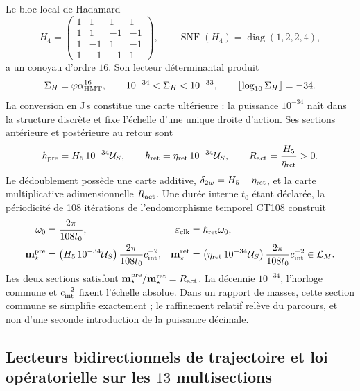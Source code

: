Le bloc local de Hadamard
\[
 H_4=
 \begin{pmatrix}
  1&1&1&1\\
  1&1&-1&-1\\
  1&-1&1&-1\\
  1&-1&-1&1
 \end{pmatrix},
 \qquad
 \operatorname{SNF}(H_4)=\operatorname{diag}(1,2,2,4),
\]
a un conoyau d'ordre \(16\). Son lecteur déterminantal produit
\begin{equation}
 \Sigma_H=\varphi\alpha_{\rm HMT}^{16},
 \qquad
 10^{-34}<\Sigma_H<10^{-33},
 \qquad
 \left\lfloor\log_{10}\Sigma_H\right\rfloor=-34.
 \label{eq:orden-menos-34-tabla-masas}
\end{equation}
La conversion en \(\mathrm{J\,s}\) constitue une carte ultérieure : la puissance
\(10^{-34}\) naît dans la structure discrète et fixe l'échelle d'une unique droite
d'action. Ses sections antérieure et postérieure au retour sont
\begin{equation}
 \hbar_{\rm pre}=H_5\,10^{-34}\mathcal U_S,\qquad
 \hbar_{\rm ret}=\eta_{\rm ret}\,10^{-34}\mathcal U_S,
 \qquad
 R_{\rm act}=\frac{H_5}{\eta_{\rm ret}}>0.
 \label{eq:accion-absoluta-y-razon-tabla-masas}
\end{equation}
Le dédoublement possède une carte additive,
\(\delta_{2w}=H_5-\eta_{\rm ret}\), et la carte multiplicative adimensionnelle
\(R_{\rm act}\). Une durée interne \(t_0\) étant déclarée, la périodicité de
108 itérations de l'endomorphisme temporel CT108 construit
\begin{align}
 \omega_0&=\frac{2\pi}{108t_0},
 &\varepsilon_{\rm clk}&=\hbar_{\rm ret}\omega_0,
 \label{eq:cuanto-reloj-masa-rectora}\\
 \mathbf m_\star^{\rm pre}
 &=\left(H_5\,10^{-34}\mathcal U_S\right)
   \frac{2\pi}{108t_0}c_{\rm int}^{-2},
 &\mathbf m_\star^{\rm ret}
 &=\left(\eta_{\rm ret}\,10^{-34}\mathcal U_S\right)
   \frac{2\pi}{108t_0}c_{\rm int}^{-2}\in\mathcal L_M.
 \label{eq:seccion-reloj-masa-rectora}
\end{align}
Les deux sections satisfont
\(\mathbf m_\star^{\rm pre}/\mathbf m_\star^{\rm ret}=R_{\rm act}\).
La décennie \(10^{-34}\), l'horloge commune et \(c_{\rm int}^{-2}\) fixent l'échelle
absolue. Dans un rapport de masses, cette section commune se simplifie exactement ; le
raffinement relatif relève du parcours, et non d'une seconde introduction de la
puissance décimale.

\subsection{Lecteurs bidirectionnels de trajectoire et loi opératorielle sur les \(13\) multisections}

